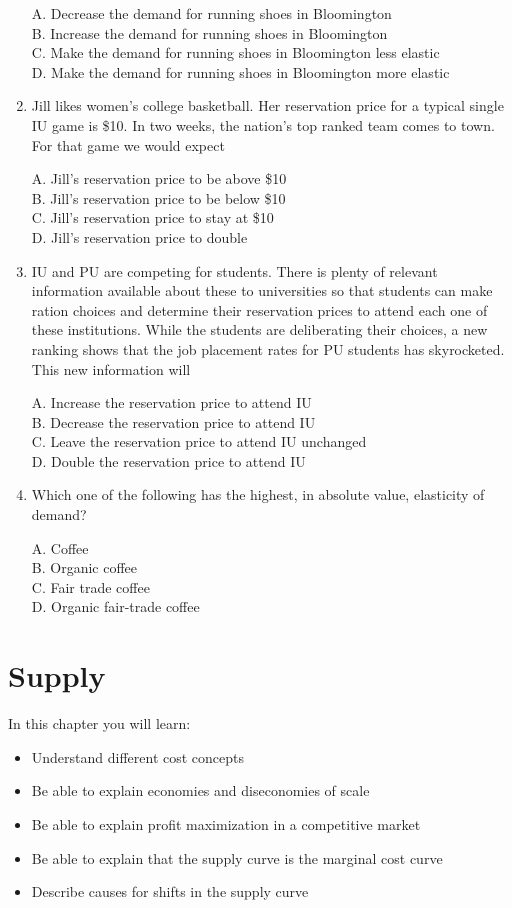 \documentclass[
]{book}
\providecommand{\tightlist}{%
  \setlength{\itemsep}{0pt}\setlength{\parskip}{0pt}}
\begin{document}
\begin{enumerate}
  A. Decrease the demand for running shoes in Bloomington\\
  B. Increase the demand for running shoes in Bloomington\\
  C. Make the demand for running shoes in Bloomington less elastic\\
  D. Make the demand for running shoes in Bloomington more elastic
\item
  Jill likes women's college basketball. Her reservation price for a typical single IU game is \$10. In two weeks, the nation's top ranked team comes to town. For that game we would expect

  A. Jill's reservation price to be above \$10\\
  B. Jill's reservation price to be below \$10\\
  C. Jill's reservation price to stay at \$10\\
  D. Jill's reservation price to double
\item
  IU and PU are competing for students. There is plenty of relevant information available about these to universities so that students can make ration choices and determine their reservation prices to attend each one of these institutions. While the students are deliberating their choices, a new ranking shows that the job placement rates for PU students has skyrocketed. This new information will

  A. Increase the reservation price to attend IU\\
  B. Decrease the reservation price to attend IU\\
  C. Leave the reservation price to attend IU unchanged\\
  D. Double the reservation price to attend IU
\item
  Which one of the following has the highest, in absolute value, elasticity of demand?

  A. Coffee\\
  B. Organic coffee\\
  C. Fair trade coffee\\
  D. Organic fair-trade coffee
\end{enumerate}

\hypertarget{supply}{%
\chapter{Supply}\label{supply}}

In this chapter you will learn:

\begin{itemize}
\tightlist
\item
  Understand different cost concepts
\item
  Be able to explain economies and diseconomies of scale
\item
  Be able to explain profit maximization in a competitive market
\item
  Be able to explain that the supply curve is the marginal cost curve
\item
  Describe causes for shifts in the supply curve
\end{itemize}
\end{document}

